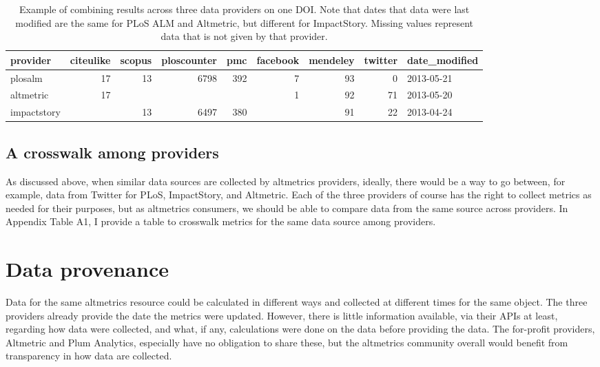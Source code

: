 \documentclass[letterpaper,superscriptaddress,showkeys,longbibliography]{revtex4-1}\usepackage{graphicx, color}
\begin{document}
\begin{table}[ht]
\centering
\caption{Example of combining results across three data providers on one DOI. Note that dates that data were last modified are the same for PLoS ALM and Altmetric, but different for ImpactStory. Missing values represent data that is not given by that provider.} 
\begin{tabular}{lrrrrrrrl}
  \hline
provider & citeulike & scopus & ploscounter & pmc & facebook & mendeley & twitter & date\_modified \\ 
  \hline
plosalm & 17 & 13 & 6798 & 392 & 7 & 93 & 0 & 2013-05-21 \\ 
  altmetric & 17 &  &  &  & 1 & 92 & 71 & 2013-05-20 \\ 
  impactstory &  & 13 & 6497 & 380 &  & 91 & 22 & 2013-04-24 \\ 
   \hline
\end{tabular}
\end{table}




\subsection*{A crosswalk among providers}

As discussed above, when similar data sources are collected by altmetrics providers, ideally, there would be a way to go between, for example, data from Twitter for PLoS, ImpactStory, and Altmetric. Each of the three providers of course has the right to collect metrics as needed for their purposes, but as altmetrics consumers, we should be able to compare data from the same source across providers. In Appendix Table A1, I provide a table to crosswalk metrics for the same data source among providers.

\section*{Data provenance}

Data for the same altmetrics resource could be calculated in different ways and collected at different times for the same object. The three providers already provide the date the metrics were updated. However, there is little information available, via their APIs at least, regarding how data were collected, and what, if any, calculations were done on the data before providing the data. The for-profit providers, Altmetric and Plum Analytics, especially have no obligation to share these, but the altmetrics community overall would benefit from transparency in how data are collected. 
\end{document}
